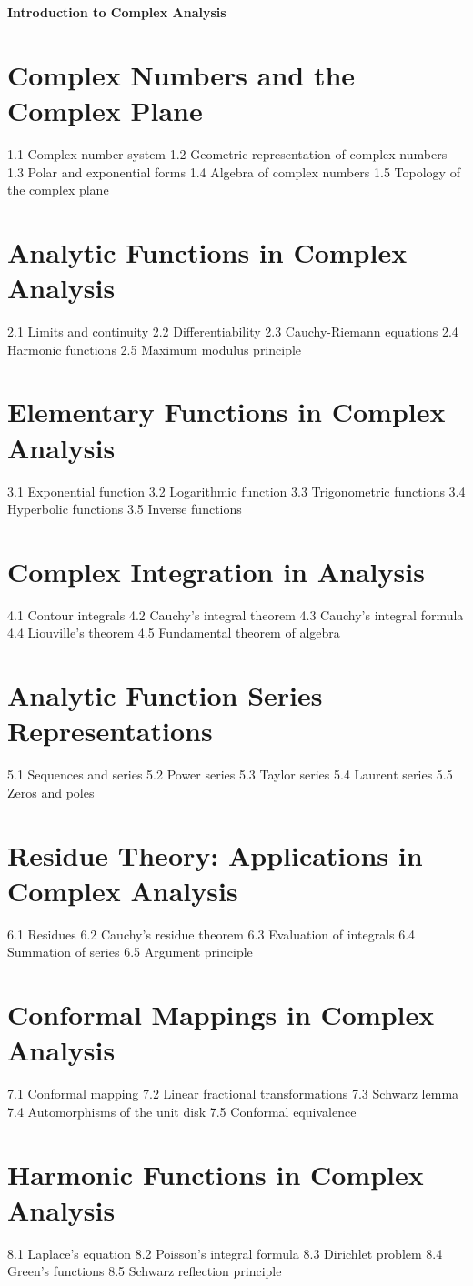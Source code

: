 {\LARGE \bf{Introduction to Complex Analysis}}
\section{Complex Numbers and the Complex Plane}
1.1 Complex number system
1.2 Geometric representation of complex numbers
1.3 Polar and exponential forms
1.4 Algebra of complex numbers
1.5 Topology of the complex plane
\section{Analytic Functions in Complex Analysis}
2.1 Limits and continuity
2.2 Differentiability
2.3 Cauchy-Riemann equations
2.4 Harmonic functions
2.5 Maximum modulus principle
\section{Elementary Functions in Complex Analysis}
3.1 Exponential function
3.2 Logarithmic function
3.3 Trigonometric functions
3.4 Hyperbolic functions
3.5 Inverse functions
\section{Complex Integration in Analysis}
4.1 Contour integrals
4.2 Cauchy's integral theorem
4.3 Cauchy's integral formula
4.4 Liouville's theorem
4.5 Fundamental theorem of algebra
\section{Analytic Function Series Representations}
5.1 Sequences and series
5.2 Power series
5.3 Taylor series
5.4 Laurent series
5.5 Zeros and poles
\section{Residue Theory: Applications in Complex Analysis}
6.1 Residues
6.2 Cauchy's residue theorem
6.3 Evaluation of integrals
6.4 Summation of series
6.5 Argument principle
\section{Conformal Mappings in Complex Analysis}
7.1 Conformal mapping
7.2 Linear fractional transformations
7.3 Schwarz lemma
7.4 Automorphisms of the unit disk
7.5 Conformal equivalence
\section{Harmonic Functions in Complex Analysis}
8.1 Laplace's equation
8.2 Poisson's integral formula
8.3 Dirichlet problem
8.4 Green's functions
8.5 Schwarz reflection principle
